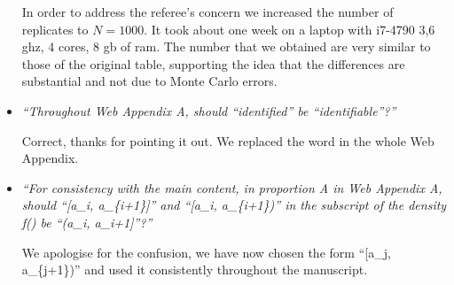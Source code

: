 \documentclass[11pt]{article}
\begin{document}
\begin{itemize}
In order to address the referee's concern we increased the number of replicates to $N=1000$. It took about one week on a laptop with i7-4790 3,6 ghz, 4 cores, 8 gb of ram. The number that we obtained are very similar to those of the original table, supporting the idea that the differences are substantial and not due to Monte Carlo errors. \\


\item \emph{``Throughout Web Appendix A, should “identified” be “identifiable”?''}

Correct, thanks for pointing it out. We replaced the word in the whole Web Appendix. \\


\item \emph{``For consistency with the main content, in proportion A in Web Appendix A, should ``[a\_i, a\_\{i+1\}]'' and ``[a\_i, a\_\{i+1\})'' in the subscript of the density f() be ``(a\_i, a\_{i+1}]''?''}

We apologise for the confusion, we have now chosen the form ``[a\_j, a\_\{j+1\})'' and used it consistently throughout the manuscript.

\end{itemize}
\end{document}
